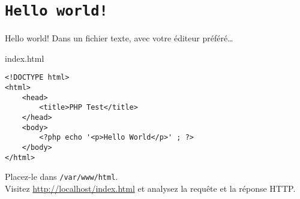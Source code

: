 

\section{\texttt{Hello world!}}

\begin{frame}[containsverbatim]{Hello world!}
	Dans un fichier texte, avec votre éditeur préféré\ldots 
	\begin{block}{index.html}
		\begin{lstlisting}
<!DOCTYPE html>
<html>
    <head>
        <title>PHP Test</title>
    </head>
    <body>
        <?php echo '<p>Hello World</p>' ; ?>
    </body>
</html>
		\end{lstlisting}
	\end{block}
	Placez-le dans \texttt{/var/www/html}.\\
	Visitez \url{http://localhost/index.html} et analysez la requête et la réponse HTTP.
\end{frame}
